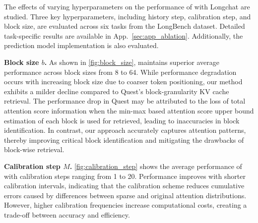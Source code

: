 The effects of varying hyperparameters on the performance of \ours with Longchat are studied. Three key hyperparameters, including history step, calibration step, and block size, are evaluated across six tasks from the LongBench dataset. Detailed task-specific results are available in App.~\ref{sec:app_ablation}. Additionally, the prediction model implementation is also evaluated.


\textbf{Block size $b$.}
As shown in \autoref{fig:block_size}, \ours maintains superior average performance across block sizes from 8 to 64.
While performance degradation occurs with increasing block size due to coarser token positioning, our method exhibits a milder decline compared to Quest's block-granularity KV cache retrieval. 
The performance drop in Quest may be attributed to the loss of total attention score information when the min-max based attention score upper bound estimation of each block is used for retrieved, leading to inaccuracies in block identification. 
In contrast, our approach accurately captures attention patterns, thereby improving critical block identification and mitigating the drawbacks of block-wise retrieval.


\textbf{Calibration step $M$.}
\autoref{fig:calibration_step} shows the average performance of \ours with calibration steps ranging from 1 to 20. Performance improves with shorter calibration intervals, indicating that the calibration scheme reduces cumulative errors caused by differences between sparse and original attention distributions. However, higher calibration frequencies increase computational costs, creating a trade-off between accuracy and efficiency.

